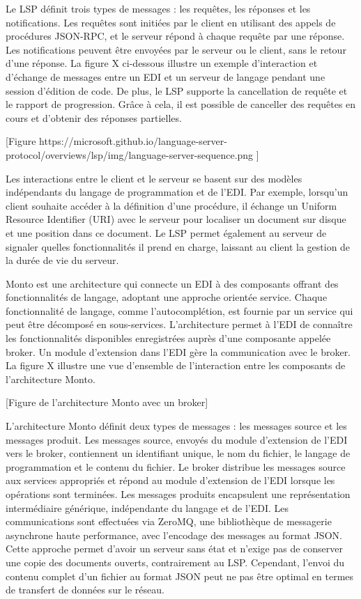 Le LSP définit trois types de messages : les requêtes, les réponses et les notifications. Les requêtes sont initiées par le client en utilisant des appels de procédures JSON-RPC, et le serveur répond à chaque requête par une réponse. Les notifications peuvent être envoyées par le serveur ou le client, sans le retour d'une réponse. La figure X ci-dessous illustre un exemple d'interaction et d'échange de messages entre un EDI et un serveur de langage pendant une session d'édition de code. De plus, le LSP supporte la cancellation de requête et le rapport de progression. Grâce à cela, il est possible de canceller des requêtes en cours et d'obtenir des réponses partielles.

    [Figure https://microsoft.github.io/language-server-protocol/overviews/lsp/img/language-server-sequence.png ]

Les interactions entre le client et le serveur se basent sur des modèles indépendants du langage de programmation et de l'EDI. Par exemple, lorsqu'un client souhaite accéder à la définition d'une procédure, il échange un Uniform Resource Identifier (URI) avec le serveur pour localiser un document sur disque et une position dans ce document. Le LSP permet également au serveur de signaler quelles fonctionnalités il prend en charge, laissant au client la gestion de la durée de vie du serveur.

Monto est une architecture qui connecte un EDI à des composants offrant des fonctionnalités de langage, adoptant une approche orientée service. Chaque fonctionnalité de langage, comme l'autocomplétion, est fournie par un service qui peut être décomposé en sous-services. L'architecture permet à l'EDI de connaître les fonctionnalités disponibles enregistrées auprès d'une composante appelée broker. Un module d'extension dans l'EDI gère la communication avec le broker. La figure X illustre une vue d'ensemble de l'interaction entre les composants de l'architecture Monto.

    [Figure de l'architecture Monto avec un broker]


L'architecture Monto définit deux types de messages : les messages source et les messages produit. Les messages source, envoyés du module d'extension de l'EDI vers le broker, contiennent un identifiant unique, le nom du fichier, le langage de programmation et le contenu du fichier. Le broker distribue les messages source aux services appropriés et répond au module d'extension de l'EDI lorsque les opérations sont terminées. Les messages produits encapsulent une représentation intermédiaire générique, indépendante du langage et de l'EDI. Les communications sont effectuées via ZeroMQ, une bibliothèque de messagerie asynchrone haute performance, avec l'encodage des messages au format JSON. Cette approche permet d'avoir un serveur sans état et n'exige pas de conserver une copie des documents ouverts, contrairement au LSP. Cependant, l'envoi du contenu complet d'un fichier au format JSON peut ne pas être optimal en termes de transfert de données sur le réseau.


